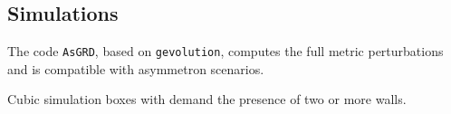 





\subsection{Simulations}

\begin{frame}{The code}
    \texttt{AsGRD},%
    based on \texttt{gevolution},%
     computes the full metric perturbations and is compatible with asymmetron scenarios. 

    \pause
    \bigskip
    Cubic simulation boxes with 
     demand the presence of two or more walls.

\begin{notes}[2][code]
\end{notes}
\end{frame}



